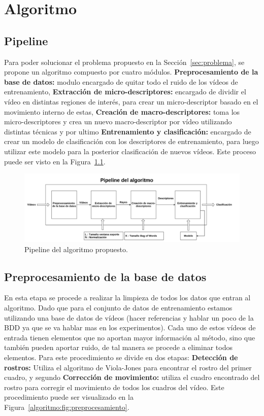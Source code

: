 \chapter[Algoritmo]{Algoritmo}
\label{ch:algoritmo}
\section{Pipeline}
\label{sec:pipeline}
Para poder solucionar el problema propuesto en la Sección~\ref{sec:problema}, se propone un algoritmo compuesto por cuatro módulos. \textbf{Preprocesamiento de la base de datos:} modulo encargado de quitar todo el ruido de los vídeos de entrenamiento, \textbf{Extracción de micro-descriptores:} encargado de dividir el vídeo en distintas regiones de interés, para crear un micro-descriptor basado en el movimiento interno de estas, \textbf{Creación de macro-descriptores:} toma los micro-descriptores y crea un nuevo macro-descriptor por vídeo utilizando distintas técnicas y por ultimo \textbf{Entrenamiento y clasificación:} encargado de crear un modelo de clasificación con los descriptores de entrenamiento, para luego utilizar este modelo para la posterior clasificación de nuevos vídeos. Este proceso puede ser visto en la Figura~\ref{algoritmo:fig:pipeline}. 

	\begin{figure}[bt]
		\centering
    		\includegraphics[width=1\textwidth]{Figuras/Diagramas/pipeline.png}
  		\caption{Pipeline del algoritmo propuesto.}
  		\label{algoritmo:fig:pipeline}
	\end{figure}	


\section{Preprocesamiento de la base de datos}
\label{sec:proc_bdd}
	En esta etapa se procede a realizar la limpieza de todos los datos que entran al algoritmo. Dado que para el conjunto de datos de entrenamiento estamos utilizando una base de datos de vídeos (hacer referencias y hablar un poco de la BDD ya que se va hablar mas en los experimentos). Cada uno de estos vídeos de entrada tienen elementos que no aportan mayor información al método, sino que también pueden aportar ruido, de tal manera se procede a eliminar todos elementos. Para este procedimiento se divide en dos etapas: \textbf{Detección de rostros:} Utiliza el algoritmo de Viola-Jones para encontrar el rostro del primer cuadro, y segundo \textbf{Corrección de movimiento:} utiliza el cuadro encontrado del rostro para corregir el movimiento de todos los cuadros del vídeo. Este procedimiento puede ser visualizado en la Figura~\ref{algoritmo:fig:preprocesamiento}. 	
	
